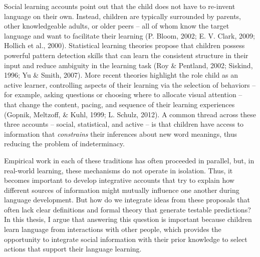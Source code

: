 \documentclass[oneside]{report}
\begin{document}
Social learning accounts point out that the child does not have to
re-invent language on their own. Instead, children are typically
surrounded by parents, other knowledgeable adults, or older peers -- all
of whom know the target language and want to facilitate their learning
(P. Bloom, 2002; E. V. Clark, 2009; Hollich et al., 2000). Statistical
learning theories propose that children possess powerful pattern
detection skills that can learn the consistent structure in their input
and reduce ambiguity in the learning task (Roy \& Pentland, 2002;
Siskind, 1996; Yu \& Smith, 2007). More recent theories highlight the
role child as an active learner, controlling aspects of their learning
via the selection of behaviors -- for example, asking questions or
choosing where to allocate visual attention -- that change the content,
pacing, and sequence of their learning experiences (Gopnik, Meltzoff, \&
Kuhl, 1999; L. Schulz, 2012). A common thread across these three
accounts -- social, statistical, and active -- is that children have
access to information that \emph{constrains} their inferences about new
word meanings, thus reducing the problem of indeterminacy.

Empirical work in each of these traditions has often proceeded in
parallel, but, in real-world learning, these mechanisms do not operate
in isolation. Thus, it becomes important to develop integrative accounts
that try to explain how different sources of information might mutually
influence one another during language development. But how do we
integrate ideas from these proposals that often lack clear definitions
and formal theory that generate testable predictions? In this thesis, I
argue that answering this question is important because children learn
language from interactions with other people, which provides the
opportunity to integrate social information with their prior knowledge
to select actions that support their language learning.
\end{document}
